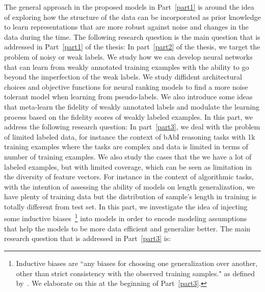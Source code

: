 The general approach in the proposed models in Part~\ref{part1} is around the idea of exploring how the structure of the data can be incorporated as prior knowledge to learn representations that are more robust against noise and changes in the data during the time. 
The following research question is the main question that is addressed in Part~\ref{part1} of the thesis:
%
In part~\ref{part2} of the thesis, we target the problem of noisy or weak labels. We study how we can develop neural networks that can learn from weakly annotated training examples with the ability to go beyond the imperfection of the weak labels. We study diffident architectural choices and objective functions for neural ranking models to find a more noise tolerant model when learning from pseudo-labels.  We also introduce some ideas that  meta-learn the fidelity of weakly annotated labels and modulate the learning process based on the fidelity scores of weakly labeled examples.
In this part, we address the following research question:
%
In part~\ref{part3}, we deal with the problem of limited labeled data, for instance the context of bAbI reasoning tasks with 1k training examples where the tasks are complex and data is limited in terms of number of training examples. We also study the cases that the we have a lot of labeled examples, but with limited coverage, which can be seen as limitation in the diversity of feature vectors. For instance in the context of algorithmic tasks, with the intention of assessing the ability of models on length generalization, we have plenty of training data but the distribution of sample's length in training is totally different from test set. 
In this part, we investigate the idea of injecting some inductive biases~\footnote{Inductive biases are ``any biases for choosing one generalization over another, other than strict consistency with the observed training samples." as defined by~\citet{Mitchell80theneed}. We elaborate on this at the beginning of Part~\ref{part3}.} into models in order to encode modeling assumptions that help the models to be more data efficient and generalize better.
The main research question that is addressed in Part~\ref{part3} is:

